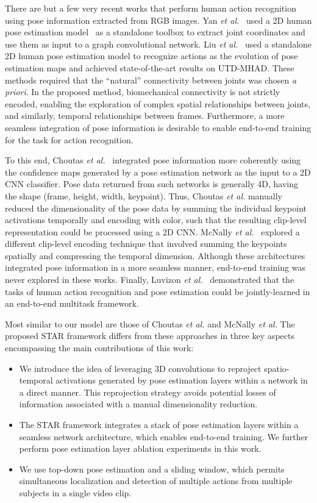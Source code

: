 \documentclass[10pt, conference, compsocconf]{IEEEtran}
\begin{document}
There are but a few very recent works that perform human action recognition using pose information extracted from RGB images. Yan \textit{et al.}~\cite{yan2018spatial} used a 2D human pose estimation model~\cite{cao2017realtime} as a standalone toolbox to extract joint coordinates and use them as input to a graph convolutional network. Liu \textit{et al.}~\cite{liu2018recognizing} used a standalone 2D human pose estimation model to recognize actions as the evolution of pose estimation maps and achieved state-of-the-art results on UTD-MHAD. These methods required that the ``natural'' connectivity between joints was chosen \textit{a priori}. In the proposed method, biomechanical connectivity is not strictly encoded, enabling the exploration of complex spatial relationships between joints, and similarly, temporal relationships between frames. Furthermore, a more seamless integration of pose information is desirable to enable end-to-end training for the task for action recognition. 

To this end, Choutas \textit{et al.}~\cite{choutas2018potion} integrated pose information more coherently using the confidence maps generated by a pose estimation network as the input to a 2D CNN classifier. Pose data returned from such networks is generally 4D, having the shape (frame, height, width, keypoint). Thus, Choutas \textit{et al.} manually reduced the dimensionality of the pose data by summing the individual keypoint activations temporally and encoding with color, such that the resulting clip-level representation could be processed using a 2D CNN. McNally \textit{et al.}~\cite{mcnally2018cvis} explored a different clip-level encoding technique that involved summing the keypoints spatially and compressing the temporal dimension. Although these architectures integrated pose information in a more seamless manner, end-to-end training was never explored in these works. Finally, Luvizon \textit{et al.}~\cite{luvizon20182d} demonstrated that the tasks of human action recognition and pose estimation could be jointly-learned in an end-to-end multitask framework.



Most similar to our model are those of Choutas \textit{et al.} and McNally \textit{et al.} The proposed STAR framework differs from these approaches in three key aspects encompassing the main contributions of this work: 
\begin{itemize}
\item We introduce the idea of leveraging 3D convolutions to reproject spatio-temporal activations generated by pose estimation layers within a network in a direct manner.  This reprojection strategy avoids potential losses of information associated with a manual dimensionality reduction. 
\item The STAR framework integrates a stack of pose estimation layers within a seamless network architecture, which enables end-to-end training. We further perform pose estimation layer ablation experiments in this work.
\item We use top-down pose estimation and a sliding window, which permits simultaneous localization and detection of multiple actions from multiple subjects in a single video clip. 
\end{itemize}
\end{document}
